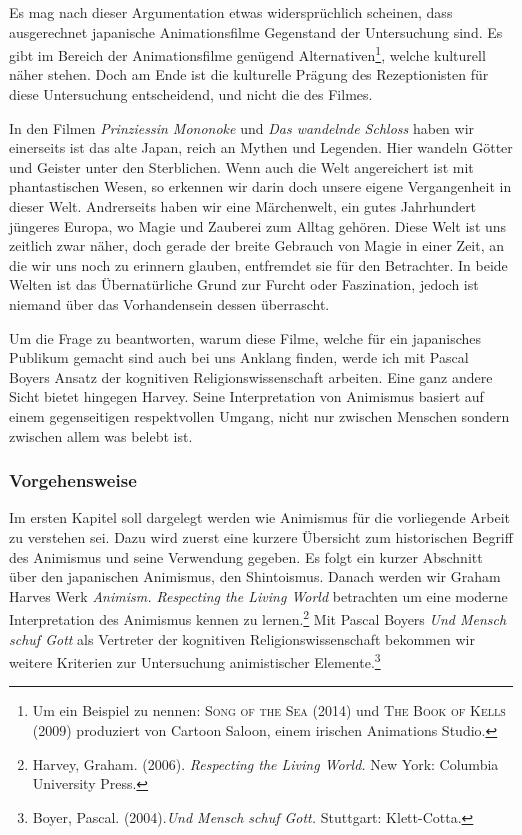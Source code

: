 Es mag nach dieser Argumentation etwas widersprüchlich scheinen, dass ausgerechnet japanische Animationsfilme Gegenstand der Untersuchung sind. Es gibt im Bereich der Animationsfilme genügend Alternativen\footnote{Um ein Beispiel zu nennen: \textsc{Song of the Sea} (2014) und \textsc{The Book of Kells} (2009) produziert von Cartoon Saloon, einem irischen Animations Studio.}, welche kulturell näher stehen. Doch am Ende ist die kulturelle Prägung des Rezeptionisten für diese Untersuchung entscheidend, und nicht die des Filmes. 

In den Filmen \emph{Prinziessin Mononoke} und \emph{Das wandelnde Schloss} haben wir einerseits ist das alte Japan, reich an Mythen und Legenden. Hier wandeln Götter und Geister unter den Sterblichen. Wenn auch die Welt angereichert ist mit phantastischen Wesen, so erkennen wir darin doch unsere eigene Vergangenheit in dieser Welt. Andrerseits haben wir eine Märchenwelt, ein gutes Jahrhundert jüngeres Europa, wo Magie und Zauberei zum Alltag gehören. Diese Welt ist uns zeitlich zwar näher, doch gerade der breite Gebrauch von Magie in einer Zeit, an die wir uns noch zu erinnern glauben, entfremdet sie für den Betrachter. In beide Welten ist das Übernatürliche Grund zur Furcht oder Faszination, jedoch ist niemand über das Vorhandensein dessen überrascht. \par 

Um die Frage zu beantworten, warum diese Filme, welche für ein japanisches Publikum gemacht sind auch bei uns Anklang finden, werde ich mit Pascal Boyers Ansatz der kognitiven Religionswissenschaft arbeiten. Eine ganz andere Sicht bietet hingegen Harvey. Seine Interpretation von Animismus basiert auf einem gegenseitigen respektvollen Umgang, nicht nur zwischen Menschen sondern zwischen allem was belebt ist.

\subsubsection*{Vorgehensweise}
Im ersten Kapitel soll dargelegt werden wie Animismus für die vorliegende Arbeit zu verstehen sei. Dazu wird zuerst eine kurzere Übersicht zum historischen Begriff des Animismus und seine Verwendung gegeben. Es folgt ein kurzer Abschnitt über den japanischen Animismus, den Shintoismus. Danach werden wir Graham Harves Werk \emph{Animism. Respecting the Living World} betrachten um eine moderne Interpretation des Animismus kennen zu lernen.\footnote{Harvey, Graham. (2006). \emph{Respecting the Living World.} New York: Columbia University Press.} Mit Pascal Boyers \emph{Und Mensch schuf Gott} als Vertreter der kognitiven Religionswissenschaft bekommen wir weitere Kriterien zur Untersuchung animistischer Elemente.\footnote{Boyer, Pascal. (2004).\emph{Und Mensch schuf Gott.} Stuttgart: Klett-Cotta.}

